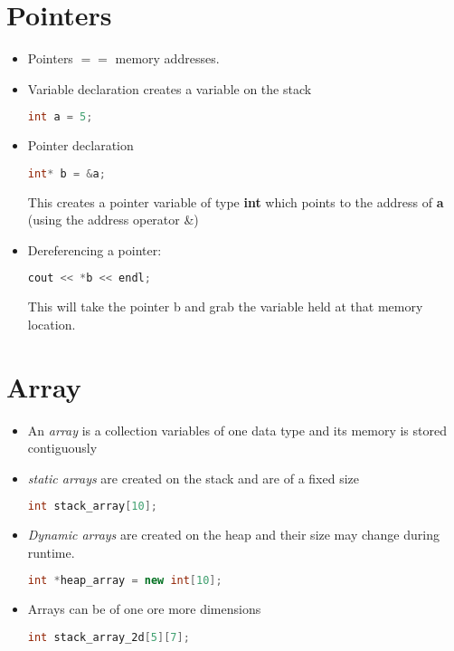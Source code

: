 \documentclass[a4paper, 11pt]{article}
\begin{document}
\section*{Pointers}
\begin{itemize}
\item Pointers $==$ memory addresses.
  
\item Variable declaration creates a variable on the stack

\begin{lstlisting}[language=C++]
int a = 5;
\end{lstlisting}
  
\item Pointer declaration
  
\begin{lstlisting}[language=C++]
int* b = &a; 
\end{lstlisting}
This creates a pointer variable of type \textbf{int} which points to the address
of \textbf{a} (using the address operator \&)

\item Dereferencing a pointer:
  
\begin{lstlisting}[language=C++]
cout << *b << endl; 
\end{lstlisting}
This will take the pointer b and grab the variable held at that memory location. 

\end{itemize}



\section*{Array}
\begin{itemize}
  \item An \textit{array} is a collection variables of one data type and its
    memory is stored contiguously

  \item \textit{static arrays} are created on the stack and are of a fixed size

\begin{lstlisting}[language=C++]
int stack_array[10]; 
\end{lstlisting}
    
  \item \textit{Dynamic arrays} are created on the heap and their size may
    change during runtime.

    
\begin{lstlisting}[language=C++]
int *heap_array = new int[10]; 
\end{lstlisting}

  \item Arrays can be of one ore more dimensions

    
\begin{lstlisting}[language=C++]
int stack_array_2d[5][7]; 
\end{lstlisting}


    

    
\end{itemize}
\end{document}
